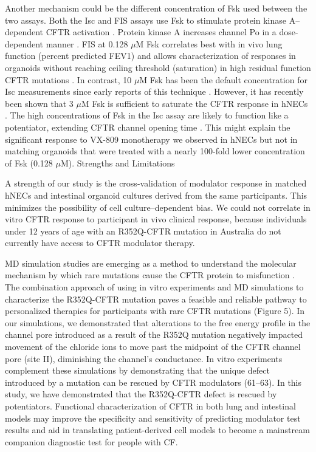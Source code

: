 Another mechanism could be the different concentration of Fsk used between the two assays. Both the Isc and FIS assays use Fsk to stimulate protein kinase A–dependent CFTR activation \cite{dekkers2013, gentzsch2017}. Protein kinase A increases channel Po in a dose-dependent manner \cite{cui2019}. FIS at 0.128 $\mu$M Fsk correlates best with in vivo lung function (percent predicted FEV1) and allows characterization of responses in organoids without reaching ceiling threshold (saturation) in high residual function CFTR mutations \cite{dekkers2016}. In contrast, 10 $\mu$M Fsk has been the default concentration for Isc measurements since early reports of this technique \cite{blouquit2002, smith1993}. However, it has recently been shown that 3 $\mu$M Fsk is sufficient to saturate the CFTR response in hNECs \cite{avramescu2017}. The high concentrations of Fsk in the Isc assay are likely to function like a potentiator, extending CFTR channel opening time \cite{cui2019}. This might explain the significant response to VX-809 monotherapy we observed in hNECs but not in matching organoids that were treated with a nearly 100-fold lower concentration of Fsk (0.128 $\mu$M).
Strengths and Limitations

A strength of our study is the cross-validation of modulator response in matched hNECs and intestinal organoid cultures derived from the same participants. This minimizes the possibility of cell culture–dependent bias. We could not correlate in vitro CFTR response to participant in vivo clinical response, because individuals under 12 years of age with an R352Q-CFTR mutation in Australia do not currently have access to CFTR modulator therapy.

MD simulation studies are emerging as a method to understand the molecular mechanism by which rare mutations cause the CFTR protein to misfunction \cite{callebaut2017}. The combination approach of using in vitro experiments and MD simulations to characterize the R352Q-CFTR mutation paves a feasible and reliable pathway to personalized therapies for participants with rare CFTR mutations (Figure 5). In our simulations, we demonstrated that alterations to the free energy profile in the channel pore introduced as a result of the R352Q mutation negatively impacted movement of the chloride ions to move past the midpoint of the CFTR channel pore (site II), diminishing the channel’s conductance. In vitro experiments complement these simulations by demonstrating that the unique defect introduced by a mutation can be rescued by CFTR modulators (61–63). In this study, we have demonstrated that the R352Q-CFTR defect is rescued by potentiators. Functional characterization of CFTR in both lung and intestinal models may improve the specificity and sensitivity of predicting modulator test results and aid in translating patient-derived cell models to become a mainstream companion diagnostic test for people with CF.
